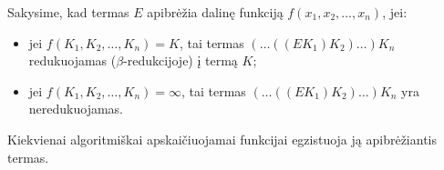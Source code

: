 \begin{defn}
  Sakysime, kad termas $E$ apibrėžia dalinę funkciją 
  $f(x_1,x_2,\dotsc,x_n)$, jei:
  \begin{itemize}
    \item jei $f(K_1,K_2,\dotsc,K_n) = K$, tai termas 
      $(\dots((EK_1)K_2)\dots)K_n$ redukuojamas ($\beta$-redukcijoje) į
      termą $K$;
    \item jei $f(K_1,K_2,\dotsc,K_n) = \infty$, tai termas 
      $(\dots((EK_1)K_2)\dots)K_n$ yra neredukuojamas.
  \end{itemize}
\end{defn}

\begin{prop}
  Kiekvienai algoritmiškai apskaičiuojamai funkcijai egzistuoja ją 
  apibrėžiantis termas.
\end{prop}


